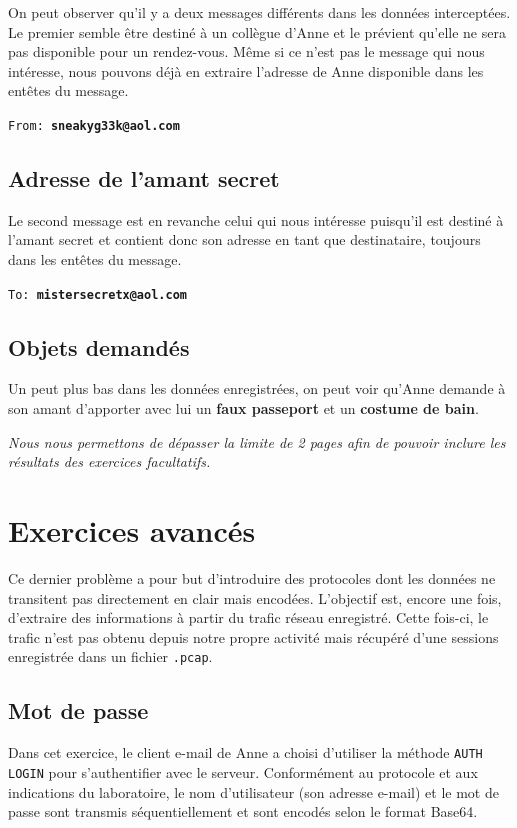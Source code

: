 \documentclass[11pt,a4paper]{article}
\begin{document}
On peut observer qu'il y a deux messages différents dans les données interceptées. Le premier semble être destiné à un collègue d'Anne et le prévient qu'elle ne sera pas disponible pour un rendez-vous. Même si ce n'est pas le message qui nous intéresse, nous pouvons déjà en extraire l'adresse de Anne disponible dans les entêtes du message.

\texttt{From: \textbf{sneakyg33k@aol.com}}

\subsection{Adresse de l'amant secret}

Le second message est en revanche celui qui nous intéresse puisqu'il est destiné à l'amant secret et contient donc son adresse en tant que destinataire, toujours dans les entêtes du message.

\texttt{To: \textbf{mistersecretx@aol.com}}

\subsection{Objets demandés}

Un peut plus bas dans les données enregistrées, on peut voir qu'Anne demande à son amant d'apporter avec lui un \textbf{faux passeport} et un \textbf{costume de bain}.

\newpage

\emph{\footnotesize 
Nous nous permettons de dépasser la limite de 2 pages afin de pouvoir inclure les résultats des exercices facultatifs.
}

\section{Exercices avancés}

Ce dernier problème a pour but d'introduire des protocoles dont les données ne transitent pas directement en clair mais encodées. L'objectif est, encore une fois, d'extraire des informations à partir du trafic réseau enregistré. Cette fois-ci, le trafic n'est pas obtenu depuis notre propre activité mais récupéré d'une sessions enregistrée dans un fichier \texttt{.pcap}.

\subsection{Mot de passe}

Dans cet exercice, le client e-mail de Anne a choisi d'utiliser la méthode \texttt{AUTH LOGIN} pour s'authentifier avec le serveur. Conformément au protocole et aux indications du laboratoire, le nom d'utilisateur (son adresse e-mail) et le mot de passe sont transmis séquentiellement et sont encodés selon le format Base64.
\end{document}
